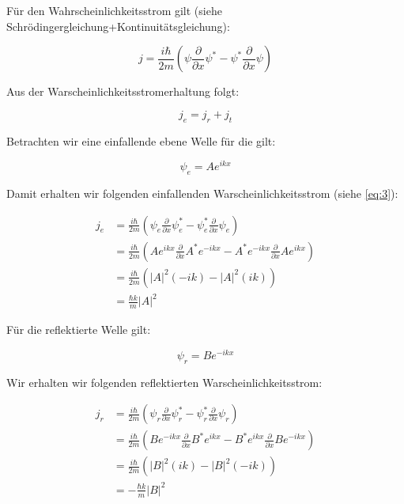 Für den Wahrscheinlichkeitsstrom gilt (siehe Schrödingergleichung+Kontinuitätsgleichung):

\begin{equation}
  \label{eq:3}
  j = \frac{i\hbar}{2m}\left(\psi \frac{\partial}{\partial x} \psi^* - \psi^* \frac{\partial}{\partial x}\psi\right)
\end{equation}

Aus der Warscheinlichkeitsstromerhaltung folgt:

\begin{equation}
  \label{eq:4}
  j_{e} = j_{r} + j_{t}
\end{equation}

Betrachten wir eine einfallende ebene Welle für die gilt:

\begin{equation}
  \label{eq:5}
  \psi_e = Ae^{ikx}
\end{equation}

Damit erhalten wir folgenden einfallenden Warscheinlichkeitsstrom (siehe \eqref{eq:3}):

\begin{align}
  \label{eq:6}
  j_e &= \frac{i\hbar}{2m}\left(\psi_e \frac{\partial}{\partial x} \psi^*_e - \psi^*_e \frac{\partial}{\partial x}\psi_e\right)\\
&= \frac{i\hbar}{2m}\left(Ae^{ikx} \frac{\partial}{\partial x} A^*e^{-ikx} - A^*e^{-ikx}\frac{\partial}{\partial x}Ae^{ikx}\right)\\
&= \frac{i\hbar}{2m}\left(|A|^2(-ik)  -|A|^2(ik)\right)\\
&= \frac{\hbar k}{m}|A|^2
\end{align}


Für die reflektierte Welle gilt:

\begin{equation}
  \label{eq:7}
  \psi_r = Be^{-ikx}
\end{equation}

Wir erhalten wir folgenden reflektierten Warscheinlichkeitsstrom:

\begin{align}
  \label{eq:8}
  j_r &= \frac{i\hbar}{2m}\left(\psi_r \frac{\partial}{\partial x} \psi^*_r - \psi^*_r \frac{\partial}{\partial x}\psi_r\right)\\
&= \frac{i\hbar}{2m}\left(Be^{-ikx} \frac{\partial}{\partial x} B^*e^{ikx} - B^*e^{ikx}\frac{\partial}{\partial x}Be^{-ikx}\right)\\
&= \frac{i\hbar}{2m}\left(|B|^2(ik)  -|B|^2(-ik)\right)\\
&= -\frac{\hbar k}{m}|B|^2
\end{align}

